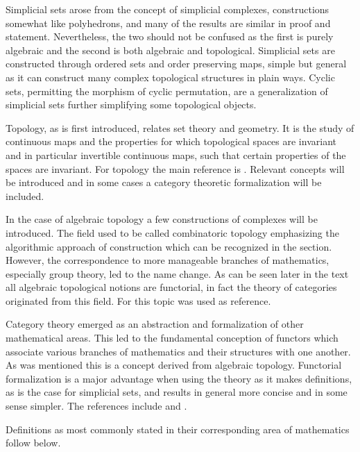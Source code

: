 \documentclass[../../main.tex]{subfiles}
\begin{document}
    Simplicial sets arose from the concept of simplicial complexes, constructions somewhat like polyhedrons, and many of the results are similar in proof and statement. Nevertheless, the two should not be confused as the first is purely algebraic and the second is both algebraic and topological. Simplicial sets are constructed through ordered sets and order preserving maps, simple but general as it can construct many complex topological structures in plain ways. Cyclic sets, permitting the morphism of cyclic permutation, are a generalization of simplicial sets further simplifying some topological objects. 
    
    Topology, as is first introduced, relates set theory and geometry. It is the study of continuous maps and the properties for which topological spaces are invariant and in particular invertible continuous maps, such that certain properties of the spaces are invariant. For topology the main reference is \cite{armstrong-basictop}. Relevant concepts will be introduced and in some cases a category theoretic formalization will be included. 
    
    In the case of algebraic topology a few constructions of complexes will be introduced. The field used to be called combinatoric topology emphasizing the algorithmic approach of construction which can be recognized in the section. However, the correspondence to more manageable branches of mathematics, especially group theory, led to the name change. As can be seen later in the text all algebraic topological notions are functorial, in fact the theory of categories originated from this field. For this topic \cite{simp-maye} was used as reference.
    
    Category theory emerged as an abstraction and formalization of other mathematical areas. This led to the fundamental conception of functors which associate various branches of mathematics and their structures with one another. As was mentioned this is a concept derived from algebraic topology. Functorial formalization is a major advantage when using the theory as it makes definitions, as is the case for simplicial sets, and results in general more concise and in some sense simpler. The references include \cite{simp-maye} and \cite{cate-mac}.

    Definitions as most commonly stated in their corresponding area of mathematics follow below. 
    
\end{document}
